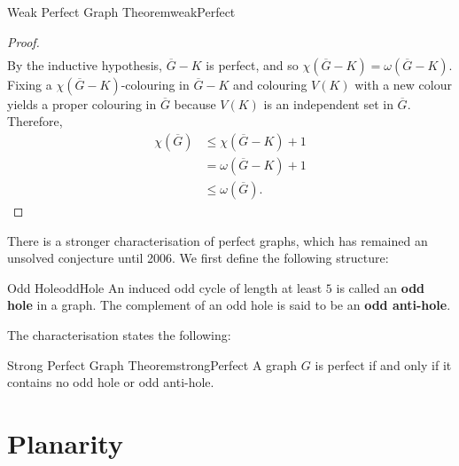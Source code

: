 \documentclass[math, code]{amznotes}
\theoremstyle{remark}
\begin{document}
\begin{thmbox}{Weak Perfect Graph Theorem}{weakPerfect}
\begin{proof}
\begin{align*}
        \end{align*}
        By the inductive hypothesis, $\overline{G} - K$ is perfect, and so $\chi\left(\overline{G} - K\right) = \omega\left(\overline{G} - K\right)$. Fixing a $\chi\left(\overline{G} - K\right)$-colouring in $\overline{G} - K$ and colouring $V(K)$ with a new colour yields a proper colouring in $\overline{G}$ because $V(K)$ is an independent set in $\overline{G}$. Therefore,
        \begin{align*}
            \chi\left(\overline{G}\right) & \leq \chi\left(\overline{G} - K\right) + 1 \\
            & = \omega\left(\overline{G} - K\right) + 1 \\
            & \leq \omega\left(\overline{G}\right).
        \end{align*}
    \end{proof}
\end{thmbox}
There is a stronger characterisation of perfect graphs, which has remained an unsolved conjecture until 2006. We first define the following structure:
\begin{dfnbox}{Odd Hole}{oddHole}
    An induced odd cycle of length at least $5$ is called an {\color{red} \textbf{odd hole}} in a graph. The complement of an odd hole is said to be an {\color{red} \textbf{odd anti-hole}}.
\end{dfnbox}
The characterisation states the following:
\begin{thmbox}{Strong Perfect Graph Theorem}{strongPerfect}
    A graph $G$ is perfect if and only if it contains no odd hole or odd anti-hole.
\end{thmbox}
\chapter{Planarity}
\end{document}
